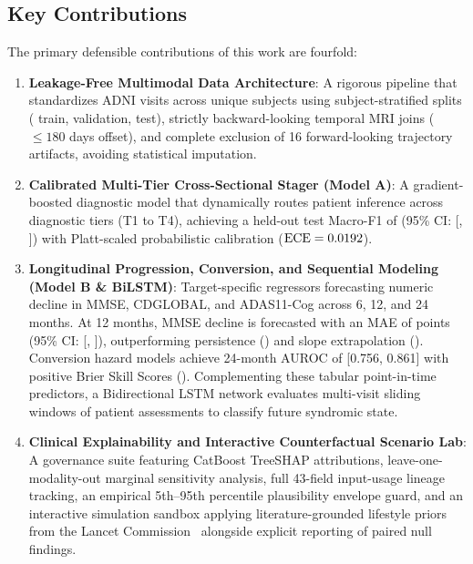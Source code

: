 \documentclass[11pt,a4paper]{article}
\begin{document}
\subsection{Key Contributions}
The primary defensible contributions of this work are fourfold:
\begin{enumerate}
    \item \textbf{Leakage-Free Multimodal Data Architecture}: A rigorous pipeline that standardizes \TotalRows{} ADNI visits across \TotalSubjects{} unique subjects using subject-stratified splits (\TrainPct{} train, \ValPct{} validation, \TestPct{} test), strictly backward-looking temporal MRI joins ($\le 180$ days offset), and complete exclusion of 16 forward-looking trajectory artifacts, avoiding statistical imputation.
    \item \textbf{Calibrated Multi-Tier Cross-Sectional Stager (Model A)}: A gradient-boosted diagnostic model that dynamically routes patient inference across diagnostic tiers (T1 to T4), achieving a held-out test Macro-F1 of \StagerTFourFOne{} (95\% CI: [\StagerTFourFCILo{}, \StagerTFourFCIHi{}]) with Platt-scaled probabilistic calibration ($\text{ECE} = 0.0192{}$).
    \item \textbf{Longitudinal Progression, Conversion, and Sequential Modeling (Model B \& BiLSTM)}: Target-specific regressors forecasting numeric decline in MMSE, CDGLOBAL, and ADAS11-Cog across 6, 12, and 24 months. At 12 months, MMSE decline is forecasted with an MAE of \MMSEMAEXII{} points (95\% CI: [\MMSECILoXII{}, \MMSECIHiXII{}]), outperforming persistence (\MMSEPersistXII{}) and slope extrapolation (\MMSESlopeXII{}). Conversion hazard models achieve 24-month AUROC of \ConvAUCXXIV{} [0.756, 0.861] with positive Brier Skill Scores (\ConvBSSXXIV{}). Complementing these tabular point-in-time predictors, a Bidirectional LSTM network evaluates multi-visit sliding windows of patient assessments to classify future syndromic state.
    \item \textbf{Clinical Explainability and Interactive Counterfactual Scenario Lab}: A governance suite featuring CatBoost TreeSHAP attributions, leave-one-modality-out marginal sensitivity analysis, full 43-field input-usage lineage tracking, an empirical 5th--95th percentile plausibility envelope guard, and an interactive simulation sandbox applying literature-grounded lifestyle priors from the Lancet Commission~\cite{livingston2024lancet} alongside explicit reporting of paired null findings.
\end{enumerate}
\end{document}
